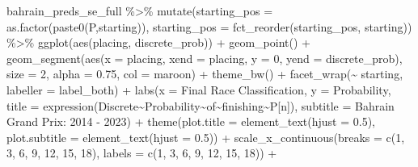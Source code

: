\documentclass[
]{book}
\newenvironment{Shaded}{\begin{snugshade}}{\end{snugshade}}
\newcommand{\AttributeTok}[1]{\textcolor[rgb]{0.77,0.63,0.00}{#1}}
\newcommand{\DecValTok}[1]{\textcolor[rgb]{0.00,0.00,0.81}{#1}}
\newcommand{\FloatTok}[1]{\textcolor[rgb]{0.00,0.00,0.81}{#1}}
\newcommand{\FunctionTok}[1]{\textcolor[rgb]{0.00,0.00,0.00}{#1}}
\newcommand{\NormalTok}[1]{#1}
\newcommand{\SpecialCharTok}[1]{\textcolor[rgb]{0.00,0.00,0.00}{#1}}
\newcommand{\StringTok}[1]{\textcolor[rgb]{0.31,0.60,0.02}{#1}}
\begin{document}
\begin{Shaded}
\begin{Highlighting}[]
\NormalTok{bahrain\_preds\_se\_full }\SpecialCharTok{\%\textgreater{}\%}
  \FunctionTok{mutate}\NormalTok{(}\AttributeTok{starting\_pos =} \FunctionTok{as.factor}\NormalTok{(}\FunctionTok{paste0}\NormalTok{(}\StringTok{\textquotesingle{}P\textquotesingle{}}\NormalTok{,starting)),}
         \AttributeTok{starting\_pos =} \FunctionTok{fct\_reorder}\NormalTok{(starting\_pos, starting)) }\SpecialCharTok{\%\textgreater{}\%}
  \FunctionTok{ggplot}\NormalTok{(}\FunctionTok{aes}\NormalTok{(placing, discrete\_prob)) }\SpecialCharTok{+}
  \FunctionTok{geom\_point}\NormalTok{() }\SpecialCharTok{+}
  \FunctionTok{geom\_segment}\NormalTok{(}\FunctionTok{aes}\NormalTok{(}\AttributeTok{x =}\NormalTok{ placing, }\AttributeTok{xend =}\NormalTok{ placing, }\AttributeTok{y =} \DecValTok{0}\NormalTok{, }\AttributeTok{yend =}\NormalTok{ discrete\_prob),}
               \AttributeTok{size =} \DecValTok{2}\NormalTok{, }\AttributeTok{alpha =} \FloatTok{0.75}\NormalTok{, }\AttributeTok{col =} \StringTok{\textquotesingle{}maroon\textquotesingle{}}\NormalTok{) }\SpecialCharTok{+}
  \FunctionTok{theme\_bw}\NormalTok{() }\SpecialCharTok{+}
  \FunctionTok{facet\_wrap}\NormalTok{(}\SpecialCharTok{\textasciitilde{}}\NormalTok{ starting, }\AttributeTok{labeller =}\NormalTok{ label\_both) }\SpecialCharTok{+}
  \FunctionTok{labs}\NormalTok{(}\AttributeTok{x =} \StringTok{\textquotesingle{}Final Race Classification\textquotesingle{}}\NormalTok{,}
       \AttributeTok{y =} \StringTok{\textquotesingle{}Probability\textquotesingle{}}\NormalTok{,}
       \AttributeTok{title =} \FunctionTok{expression}\NormalTok{(Discrete}\SpecialCharTok{\textasciitilde{}}\NormalTok{Probability}\SpecialCharTok{\textasciitilde{}}\NormalTok{of}\SpecialCharTok{\textasciitilde{}}\NormalTok{finishing}\SpecialCharTok{\textasciitilde{}}\NormalTok{P[n]),}
       \AttributeTok{subtitle =} \StringTok{\textquotesingle{}Bahrain Grand Prix: 2014 {-} 2023\textquotesingle{}}\NormalTok{) }\SpecialCharTok{+}
  \FunctionTok{theme}\NormalTok{(}\AttributeTok{plot.title =} \FunctionTok{element\_text}\NormalTok{(}\AttributeTok{hjust =} \FloatTok{0.5}\NormalTok{),}
        \AttributeTok{plot.subtitle =} \FunctionTok{element\_text}\NormalTok{(}\AttributeTok{hjust =} \FloatTok{0.5}\NormalTok{)) }\SpecialCharTok{+}
  \FunctionTok{scale\_x\_continuous}\NormalTok{(}\AttributeTok{breaks =} \FunctionTok{c}\NormalTok{(}\DecValTok{1}\NormalTok{, }\DecValTok{3}\NormalTok{, }\DecValTok{6}\NormalTok{, }\DecValTok{9}\NormalTok{, }\DecValTok{12}\NormalTok{, }\DecValTok{15}\NormalTok{, }\DecValTok{18}\NormalTok{), }\AttributeTok{labels =} \FunctionTok{c}\NormalTok{(}\DecValTok{1}\NormalTok{, }\DecValTok{3}\NormalTok{, }\DecValTok{6}\NormalTok{, }\DecValTok{9}\NormalTok{, }\DecValTok{12}\NormalTok{, }\DecValTok{15}\NormalTok{, }\DecValTok{18}\NormalTok{)) }\SpecialCharTok{+}

\end{Highlighting}
\end{Shaded}
\end{document}
